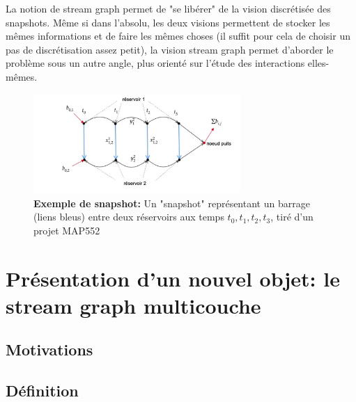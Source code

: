 \documentclass[11pt,a4paper]{article}
\theoremstyle{definition}
\theoremstyle{remark}
\theoremstyle{remark}
\def \stg {stream graph}
\def \stgm {stream graph multicouche}
\begin{document}
La notion de \stg{} permet de "se libérer" de la vision discrétisée des snapshots. Même si dans l'absolu, les deux visions permettent de stocker les mêmes informations et de faire les mêmes choses (il suffit pour cela de choisir un pas de discrétisation assez petit), la vision \stg{} permet d'aborder le problème sous un autre angle, plus orienté sur l'étude des interactions elles-mêmes.

\begin{figure}
\centering
	\includegraphics[width=0.7\textwidth]{snapshot.JPG}
	\caption{\textbf{Exemple de snapshot:} Un "snapshot" représentant un barrage (liens bleus) entre deux réservoirs aux temps $t_0,t_1,t_2,t_3$, tiré d'un projet MAP552}
\end{figure}




 
\section{Présentation d'un nouvel objet: le \stgm{}}



\subsection{Motivations}
\subsection{Définition}
\end{document}
